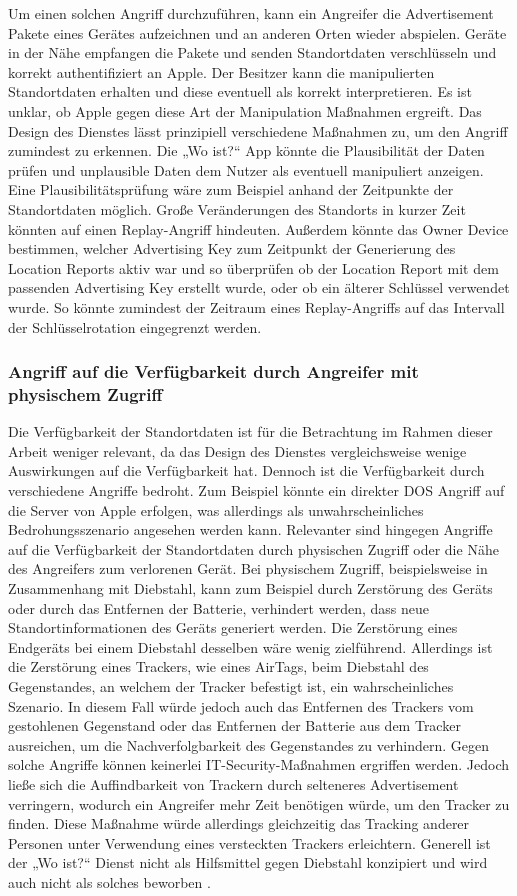 Um einen solchen Angriff durchzuführen, kann ein Angreifer die Advertisement Pakete eines Gerätes aufzeichnen und an anderen Orten wieder abspielen.
Geräte in der Nähe empfangen die Pakete und senden Standortdaten verschlüsseln und korrekt authentifiziert an Apple.
Der Besitzer kann die manipulierten Standortdaten erhalten und diese eventuell als korrekt interpretieren.
Es ist unklar, ob Apple gegen diese Art der Manipulation Maßnahmen ergreift.
Das Design des Dienstes lässt prinzipiell verschiedene Maßnahmen zu, um den Angriff zumindest zu erkennen.
Die „Wo ist?“ App könnte die Plausibilität der Daten prüfen und unplausible Daten dem Nutzer als eventuell manipuliert anzeigen.
Eine Plausibilitätsprüfung wäre zum Beispiel anhand der Zeitpunkte der Standortdaten möglich.
Große Veränderungen des Standorts in kurzer Zeit könnten auf einen Replay-Angriff hindeuten.
Außerdem könnte das Owner Device bestimmen, welcher Advertising Key zum Zeitpunkt der Generierung des Location Reports aktiv war und so überprüfen ob der Location Report mit dem passenden Advertising Key erstellt wurde, oder ob ein älterer Schlüssel verwendet wurde.
So könnte zumindest der Zeitraum eines Replay-Angriffs auf das Intervall der Schlüsselrotation eingegrenzt werden.

\subsubsection{Angriff auf die Verfügbarkeit durch Angreifer mit physischem Zugriff}
Die Verfügbarkeit der Standortdaten ist für die Betrachtung im Rahmen dieser Arbeit weniger relevant, da das Design des Dienstes vergleichsweise wenige Auswirkungen auf die Verfügbarkeit hat.
Dennoch ist die Verfügbarkeit durch verschiedene Angriffe bedroht.
Zum Beispiel könnte ein direkter \ac{DOS} Angriff auf die Server von Apple erfolgen, was allerdings als unwahrscheinliches Bedrohungsszenario angesehen werden kann.
Relevanter sind hingegen Angriffe auf die Verfügbarkeit der Standortdaten durch physischen Zugriff oder die Nähe des Angreifers zum verlorenen Gerät.
Bei physischem Zugriff, beispielsweise in Zusammenhang mit Diebstahl, kann zum Beispiel durch Zerstörung des Geräts oder durch das Entfernen der Batterie, verhindert werden, dass neue Standortinformationen des Geräts generiert werden.
Die Zerstörung eines Endgeräts bei einem Diebstahl desselben wäre wenig zielführend.
Allerdings ist die Zerstörung eines Trackers, wie eines AirTags, beim Diebstahl des Gegenstandes, an welchem der Tracker befestigt ist, ein wahrscheinliches Szenario.
In diesem Fall würde jedoch auch das Entfernen des Trackers vom gestohlenen Gegenstand oder das Entfernen der Batterie aus dem Tracker ausreichen, um die Nachverfolgbarkeit des Gegenstandes zu verhindern.
Gegen solche Angriffe können keinerlei IT-Security-Maßnahmen ergriffen werden.
Jedoch ließe sich die Auffindbarkeit von Trackern durch selteneres Advertisement verringern, wodurch ein Angreifer mehr Zeit benötigen würde, um den Tracker zu finden.
Diese Maßnahme würde allerdings gleichzeitig das Tracking anderer Personen unter Verwendung eines versteckten Trackers erleichtern.
Generell ist der „Wo ist?“ Dienst nicht als Hilfsmittel gegen Diebstahl konzipiert und wird auch nicht als solches beworben \cite{Apple_WoIst}.

